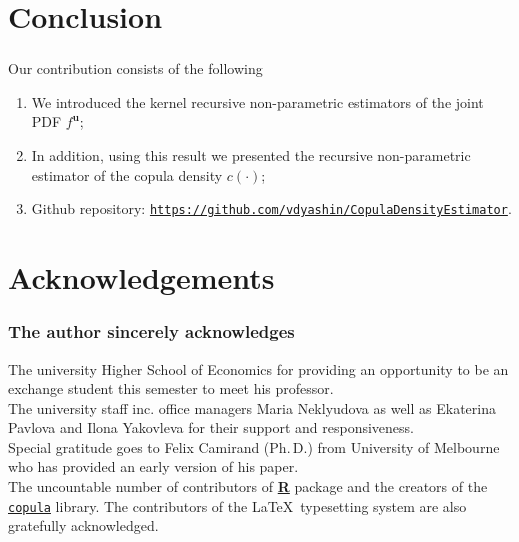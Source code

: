 \documentclass[aspectratio=169]{beamer}
\begin{document}
\section{Conclusion}
	\begin{frame}
		\frametitle{\insertsection}
		
		Our contribution consists of the following
		\begin{enumerate}
			\item<1-> We introduced the kernel recursive non-parametric estimators of the joint PDF $ f^\mathbf{u} $;
			\item<2-> In addition, using this result we presented the recursive non-parametric estimator of the copula density $ c(\cdot) $;
			\item<3-> Github repository: \href{https://github.com/vdyashin/CopulaDensityEstimator}{\color{blue}\texttt{https://github.com/vdyashin/CopulaDensityEstimator}}.
		\end{enumerate}
		
	\end{frame}
	
\section{Acknowledgements}
	\begin{frame}
		\frametitle{The author sincerely acknowledges}
		
		The university Higher School of Economics for providing an opportunity to be an exchange student this semester to meet his professor. \\[1em]
		
		The university staff inc. office managers Maria Neklyudova as well as Ekaterina Pavlova and Ilona Yakovleva for their support and responsiveness. \\[1em]
		
		Special gratitude goes to Felix Camirand (Ph.\,D.) from University of Melbourne who has provided an early version of his paper.\\[1em]
		
		The uncountable number of contributors of \href{https://R-project.org/}{\textbf{R}} package and the creators of the \href{https://cran.r-project.org/web/packages/copula/copula.pdf}{\texttt{copula}} library. The contributors of the \LaTeX~typesetting system are also gratefully acknowledged. 
		
	\end{frame}
			
\section{}
	\maketitle
	
\end{document}
